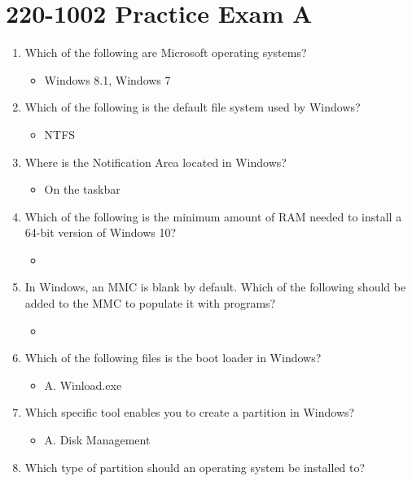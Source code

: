 \documentclass{article}
\begin{document}
\section{220-1002 Practice Exam A}
\begin{enumerate}
    \item Which of the following are Microsoft operating systems? 
    \begin{itemize}
        \item Windows 8.1, Windows 7 
    \end{itemize}
    \item Which of the following is the default file system used by Windows? 
    \begin{itemize}
        \item NTFS
    \end{itemize}
    \item Where is the Notification Area located in Windows?
    \begin{itemize}
        \item On the taskbar 
    \end{itemize}
    \item Which of the following is the minimum amount of RAM needed to
install a 64-bit version of Windows 10?
     \begin{itemize}
         \item 
     \end{itemize}
     \item In Windows, an MMC is blank by default. Which of the following
should be added to the MMC to populate it with programs?
     \begin{itemize}
         \item 
     \end{itemize}
     \item Which of the following files is the boot loader in Windows?
     \begin{itemize}
         \item A. Winload.exe
     \end{itemize}
     \item Which specific tool enables you to create a partition in Windows?
     \begin{itemize}
         \item A. Disk Management
     \end{itemize}
     \item Which type of partition should an operating system be installed to?
     \begin{itemize}

\end{itemize}
\end{enumerate}
\end{document}
